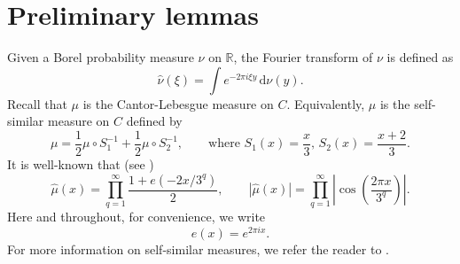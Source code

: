 \documentclass[amssymb,amsfonts,refcheck,12pt,verbatim,righttag]{amsart}
\numberwithin{equation}{section} %
\newcommand{\R}{\mathbb{R}}
\theoremstyle{plain}
\begin{document}
\section{Preliminary lemmas}\label{S2Preliminary}

Given a Borel probability measure $\nu$ on $\R$, the Fourier transform of $\nu$ is defined as 
\[\widehat\nu(\xi)=\int e^{-2\pi i \xi y}\,\mathrm{d}\nu(y).\]
Recall that $\mu$ is the Cantor-Lebesgue measure on $C$. Equivalently, $\mu$ is  the self-similar measure on $C$ defined by
\[
\mu = \frac12 \mu\circ S_1^{-1} + \frac12 \mu\circ S_2^{-1},
\qquad \text{where }
S_1(x)=\frac{x}{3},\, S_2(x)=\frac{x+2}{3}.
\]
It is well-known that  (see \cite[page 342]{Strichartz1993})
\begin{equation*}\label{eq:fourier-product}
	\widehat\mu(x)
	= \prod_{q=1}^{\infty} \frac{1+e(-2x/3^q)}{2},
	\qquad
	|\widehat\mu(x)|
	= \prod_{q=1}^{\infty}\left|\cos\left(\frac{2\pi x}{3^q}\right)\right|.
\end{equation*}
Here and throughout, for convenience, we write 
\[e(x)=e^{2\pi i x}.\]
For more information on  self-similar measures,  we refer the reader to \cite{Falconer14}. 
\end{document}
